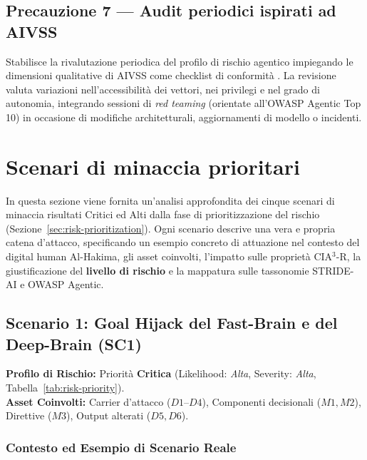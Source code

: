 \documentclass[11pt,a4paper]{article}
\begin{document}
\subsection{Precauzione 7 --- Audit periodici ispirati ad AIVSS}
Stabilisce la rivalutazione periodica del profilo di rischio agentico impiegando le dimensioni qualitative di AIVSS come checklist di conformità \cite{damianiagentic}. La revisione valuta variazioni nell'accessibilità dei vettori, nei privilegi e nel grado di autonomia, integrando sessioni di \emph{red teaming} (orientate all'OWASP Agentic Top 10) in occasione di modifiche architetturali, aggiornamenti di modello o incidenti.


\section{Scenari di minaccia prioritari}
\label{sec:scenari-prioritari}

In questa sezione viene fornita un'analisi approfondita dei cinque scenari di minaccia risultati
Critici ed Alti dalla fase di prioritizzazione del rischio (Sezione~\ref{sec:risk-prioritization}).
Ogni scenario descrive una vera e propria catena d'attacco, specificando un esempio concreto di attuazione nel contesto del digital human Al-Hakima, gli asset coinvolti, l'impatto sulle proprietà CIA$^3$-R, la giustificazione del \textbf{livello di rischio} e la mappatura sulle tassonomie STRIDE-AI e OWASP Agentic.

\subsection{Scenario 1: Goal Hijack del Fast-Brain e del Deep-Brain (SC1)}
\label{sec:sc1}

\noindent\textbf{Profilo di Rischio:} Priorità \textbf{Critica} (Likelihood: \emph{Alta}, Severity: \emph{Alta}, Tabella~\ref{tab:risk-priority}).\\
\textbf{Asset Coinvolti:} Carrier d'attacco ($D1$--$D4$), Componenti decisionali ($M1, M2$), Direttive ($M3$), Output alterati ($D5, D6$).

\subsubsection{Contesto ed Esempio di Scenario Reale}
\end{document}
